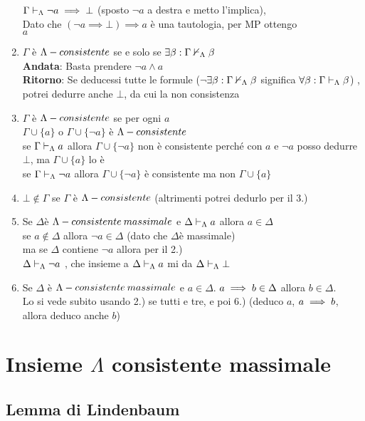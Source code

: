 \begin{enumerate}
 $\Gamma\vdash_{\Lambda}\neg a\implies\bot$ (sposto $\neg a$ a destra
e metto l'implica), \\
 Dato che $(\neg a\implies\bot)\implies a$ è una tautologia, per
MP ottengo\\
 $a$ 
\item $\Gamma$ è $ $$\mbox{\ensuremath{\Lambda}}-consistente$ se e solo se $\exists\beta:\Gamma\nvdash_{\Lambda}\beta$
\\
 \textbf{Andata}: Basta prendere $\neg a\wedge a$\\
 \textbf{Ritorno}: Se deducessi tutte le formule ($\neg$$\exists\beta:\Gamma\nvdash_{\Lambda}\beta$
significa $\forall\beta:\Gamma\vdash_{\Lambda}\beta$) , potrei dedurre anche
$\bot$, da cui la non consistenza 
\item $\Gamma$ è $\mbox{\ensuremath{\Lambda}}-consistente$ se per ogni $a$ \\
 $\Gamma\cup\{a\}$ o $\Gamma\cup\{\neg a\}$ è $\mbox{\ensuremath{\Lambda}}-consistente$\\
 se $\Gamma\vdash_{\Lambda}a$ allora $ $$\Gamma\cup\{\neg a\}$ non è consistente
perché con $a$ e $\neg a$ posso dedurre $\bot$, ma $\Gamma\cup\{a\}$
lo è \\
 se $\Gamma\vdash_{\Lambda}\neg a$ allora $ $$\Gamma\cup\{\neg a\}$ è
consistente ma non $\Gamma\cup\{a\}$ 
\item $\bot$$\notin\Gamma$ se $\Gamma$ è $\mbox{\ensuremath{\Lambda}}-consistente$ (altrimenti potrei
dedurlo per il 3.) 
\item Se $\Delta$è $\mbox{\ensuremath{\Lambda}}-consistente\: massimale$ e $\Delta\vdash_{\Lambda}a$ allora
$a\in\Delta$\\
 se $a\notin\Delta$ allora $\neg a\in\Delta$ (dato che $\Delta$è
massimale) \\
 ma se $\Delta$ contiene $\neg a$ allora per il 2.)\\
 $\Delta\vdash_{\Lambda}\neg a$ , che insieme a $\Delta\vdash_{\Lambda}a$ mi
da $\Delta\vdash_{\Lambda}\bot$ 
\item Se $\Delta$ è $\Lambda-consistente\: massimale$ e $ $$a\in\Delta$. $a\implies b\in\Delta$
allora $b\in\Delta$. \\
 Lo si vede subito usando 2.) se tutti e tre, e poi 6.) (deduco $a$,
$a\implies b$, allora deduco anche $b$) 
\end{enumerate}

\section{Insieme $\Lambda$ consistente massimale}


\subsection{Lemma di Lindenbaum}

